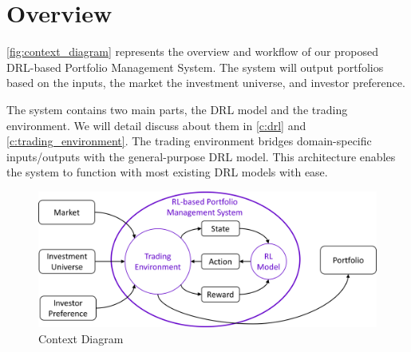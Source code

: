 \section{Overview}
\autoref{fig:context_diagram} represents the overview and workflow of our proposed DRL-based Portfolio Management System.
The system will output portfolios based on the inputs, the market the investment universe, and investor preference. 
\par
The system contains two main parts, the DRL model and the trading environment. We will detail discuss about them in \autoref{c:drl} and \autoref{c:trading_environment}. The trading environment bridges domain-specific inputs/outputs with the general-purpose DRL model. This architecture enables the system to function with most existing DRL models with ease. 
 
\begin{figure}[hbt]
  \includegraphics[width=15cm]{images/context_diagram.png}
  \caption{Context Diagram}
  \label{fig:context_diagram}
\end{figure}